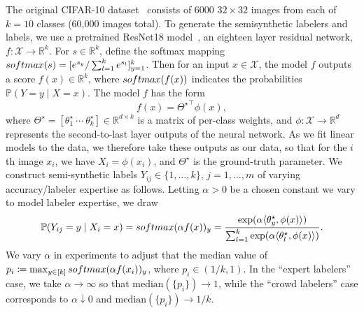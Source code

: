 \documentclass[11pt]{article}
\newcommand{\R}{\mathbb{R}} %
\renewcommand{\P}{\mathbb{P}}
\newcommand{\mc}[1]{\mathcal{#1}}
\newcommand{\<}{\langle} %
\renewcommand{\>}{\rangle}
\newcommand{\defeq}{\coloneqq}
\newcommand{\opt}{^\star}
\begin{document}
The original CIFAR-10 dataset~\cite{KrizhevskyHi09} consists of 6000
$32 \times 32$ images from each of $k = 10$ classes (60,000 images total).
To generate the semisynthetic labelers and labels, we use a pretrained
ResNet18 model~\cite{HeZhReSu16}, an eighteen layer residual network, $f:
\mc{X} \to \R^k$. For $s \in \R^k$, define the softmax mapping $\softmax(s)
= [e^{s_y} / \sum_{l = 1}^k e^{s_l}]_{y = 1}^k$.  Then for an input $x \in
\mc{X}$, the model $f$ outputs a score $f(x) \in \R^k$, where
$\softmax(f(x))$ indicates the probabilities $\P(Y = y \mid X = x)$.
The model $f$ has the form
\begin{equation*}
  f(x) = {\Theta\opt}^\top \phi(x),
\end{equation*}
where $\Theta\opt = [\theta\opt_1 ~ \cdots ~ \theta\opt_k] \in \R^{d \times
  k}$ is a matrix of per-class weights, and $\phi : \mc{X} \to \R^d$
represents the second-to-last layer outputs of the neural network.  As we
fit linear models to the data, we therefore take these outputs as our data,
so that for the $i$th image $x_i$, we have $X_i = \phi(x_i)$, and
$\Theta\opt$ is the ground-truth parameter.  We construct semi-synthetic
labels $Y_{ij} \in \{1, \ldots, k\}$, $j = 1, \ldots, m$ of varying
accuracy/labeler expertise as follows. Letting $\alpha > 0$
be a chosen constant we vary to model labeler expertise, we draw
\begin{equation*}
  \P(Y_{ij} = y \mid X_i = x)
  = \softmax(\alpha f(x))_y
  = \frac{\exp(\alpha \<\theta\opt_y, \phi(x)\>)}{
    \sum_{l = 1}^k \exp(\alpha \<\theta\opt_l, \phi(x)\>)}.
\end{equation*}
We vary $\alpha$ in experiments to adjust that the median value
of $p_i \defeq \max_{y \in [k]} \softmax(\alpha f(x_i))_y$, where
$p_i \in (1/k, 1)$. In the ``expert labelers'' case, we take
$\alpha \to \infty$ so that $\mbox{median}(\{p_i\}) \to 1$,
while the ``crowd labelers'' case corresponds to
$\alpha \downarrow 0$ and $\mbox{median}(\{p_i\}) \to 1/k$.
\end{document}
